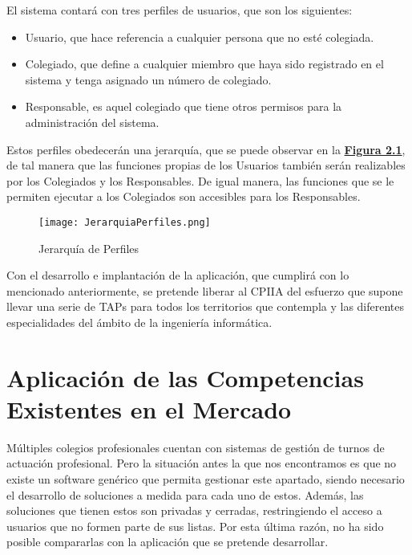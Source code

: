 El sistema contará con tres perfiles de usuarios, que son los siguientes:
\begin{itemize}
	\item Usuario, que hace referencia a cualquier persona que no esté colegiada.
	\item Colegiado, que define a cualquier miembro que haya sido registrado en el sistema y tenga asignado un número de colegiado.
	\item Responsable, es aquel colegiado que tiene otros permisos para la administración del sistema. \\
\end{itemize}


Estos perfiles obedecerán una jerarquía, que se puede observar en la \textbf{\hyperref[fig:jerarquiaPerfiles]{Figura 2.1}}, de tal manera que las funciones propias de los Usuarios también serán realizables por los Colegiados y los Responsables. De igual manera, las funciones que se le permiten ejecutar a los Colegiados son accesibles para los Responsables.

\begin{figure}[!htbp]
  \centering
  \texttt{[image: JerarquiaPerfiles.png]}
  \caption{Jerarquía de Perfiles}
  \label{fig:jerarquiaPerfiles}
\end{figure}
\FloatBarrier

Con el desarrollo e implantación de la aplicación, que cumplirá con lo mencionado anteriormente, se pretende liberar al CPIIA del esfuerzo que supone llevar una serie de TAPs para todos los territorios que contempla y las diferentes especialidades del ámbito de la ingeniería informática.


\section{Aplicación de las Competencias Existentes en el Mercado}
Múltiples colegios profesionales cuentan con sistemas de gestión de turnos de actuación profesional. Pero la situación antes la que nos encontramos es que no existe un software genérico que permita gestionar este apartado, siendo necesario el desarrollo de soluciones a medida para cada uno de estos. Además, las soluciones que tienen estos son privadas y cerradas, restringiendo el acceso a usuarios que no formen parte de sus listas. Por esta última razón, no ha sido posible compararlas con la aplicación que se pretende desarrollar.
